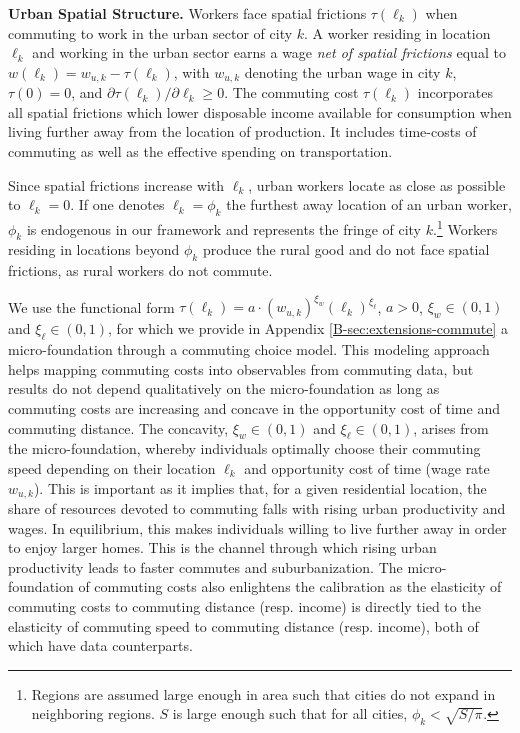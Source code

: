 \documentclass[20250130-paper.tex]{subfiles}
\begin{document}
\textbf{Urban Spatial Structure.} Workers face spatial frictions $\tau(\ell_k)$ when commuting to work in the urban sector of city $k$. A worker residing in location $\ell_k$ and working in the urban sector earns a wage \textit{net of spatial frictions} equal to $w(\ell_k)=w_{u,k} - \tau(\ell_k)$, with $w_{u,k}$ denoting the urban wage in city $k$, $\tau(0)=0$, and $\partial \tau(\ell_k)/\partial \ell_k \geq 0$. The commuting cost $\tau(\ell_k)$ incorporates all spatial frictions which lower disposable income available for consumption when living further away from the location of production. It includes time-costs of commuting as well as the effective spending on transportation.%

Since spatial frictions increase with $\ell_k$, urban workers locate as close as possible to $\ell_k=0$. If one denotes $\ell_k=\phi_k$ the furthest away location of an urban worker, $\phi_k$ is endogenous in our framework and represents the fringe of city $k$.\footnote{Regions are assumed large enough in area such that cities do not expand in neighboring regions. $S$ is large enough such that for all cities, $\phi_k<\sqrt{S/\pi}$.} Workers residing in locations beyond $\phi_k$ produce the rural good and do not face spatial frictions, as rural workers do not commute.

We use the functional form $\tau(\ell_k)= a\cdot (w_{u,k})^{\xi_w}(\ell_k)^{\xi_\ell}$, $a>0$, $\xi_w \in (0,1)$ and $\xi_\ell \in (0,1)$, for which we provide in Appendix \ref{B-sec:extensions-commute} a micro-foundation through a commuting choice model. This modeling approach helps mapping commuting costs into observables from commuting data, but results do not depend qualitatively on the micro-foundation as long as commuting costs are increasing and concave in the opportunity cost of time and commuting distance. The concavity, $\xi_w \in (0,1)$ and $\xi_\ell \in (0,1)$, arises from the micro-foundation, whereby individuals optimally choose their commuting speed depending on their location $\ell_k$ and opportunity cost of time (wage rate $w_{u,k}$). This is important as it implies that, for a given residential location, the share of resources devoted to commuting falls with rising urban productivity and wages. In equilibrium, this makes individuals willing to live further away in order to enjoy larger homes. This is the channel through which rising urban productivity leads to faster commutes and suburbanization. The micro-foundation of commuting costs also enlightens the calibration as the elasticity of commuting costs to commuting distance (resp. income) is directly tied to the elasticity of commuting speed to commuting distance (resp. income), both of which have data counterparts. 
\end{document}
